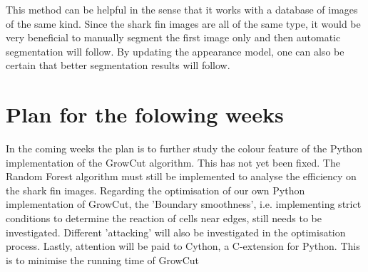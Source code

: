 \documentclass[a4paper,10pt]{article}
\begin{document}
\noindent This method can be helpful in the sense that it works with a database of images of the same kind.  Since the shark fin images are all of the same type, it would be very beneficial to manually segment the first image only and then automatic segmentation will follow.  By updating the appearance model, one can also be certain that better segmentation results will follow.  \\  


\section{Plan for the folowing weeks}
In the coming weeks the plan is to further study the colour feature of the Python implementation of the GrowCut algorithm.  This has not yet been fixed.  The Random Forest algorithm must still be implemented to analyse the efficiency on the shark fin images. Regarding the optimisation of our own Python implementation of GrowCut, the 'Boundary smoothness', i.e. implementing strict conditions to determine the reaction of cells near edges, still needs to be investigated.  Different 'attacking' will also be investigated in the optimisation process.  Lastly, attention will be paid to Cython, a C-extension for Python.  This is to minimise the running time of GrowCut

\newpage

\end{document}
